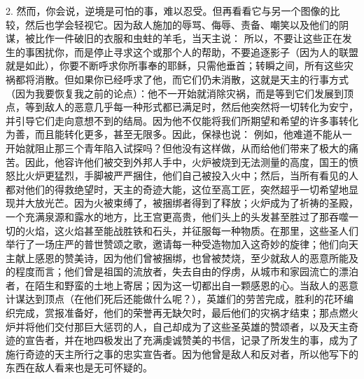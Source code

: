 2. 然而，你会说，逆境是可怕的事，难以忍受。但再看看它与另一个图像的比较，然后也学会轻视它。因为敌人施加的辱骂、侮辱、责备、嘲笑以及他们的阴谋，被比作一件破旧的衣服和虫蛀的羊毛，当天主说： 所以，不要让这些正在发生的事困扰你，而是停止寻求这个或那个人的帮助，不要追逐影子（因为人的联盟就是如此），你要不断呼求你所事奉的耶稣，只需他垂首；转瞬之间，所有这些灾祸都将消散。但如果你已经呼求了他，而它们仍未消散，这就是天主的行事方式（因为我要恢复我之前的论点）：他不一开始就消除灾祸，而是等到它们发展到顶点，等到敌人的恶意几乎每一种形式都已满足时，然后他突然将一切转化为安宁，并引导它们走向意想不到的结局。因为他不仅能将我们所期望和希望的许多事转化为善，而且能转化更多，甚至无限多。因此，保禄也说： 例如，他难道不能从一开始就阻止那三个青年陷入试探吗？但他没有这样做，从而给他们带来了极大的痛苦。因此，他容许他们被交到外邦人手中，火炉被烧到无法测量的高度，国王的愤怒比火炉更猛烈，手脚被严严捆住，他们自己被投入火中；然后，当所有看见的人都对他们的得救绝望时，天主的奇迹大能，这位至高工匠，突然超乎一切希望地显现并大放光芒。因为火被束缚了，被捆绑者得到了释放；火炉成为了祈祷的圣殿，一个充满泉源和露水的地方，比王宫更高贵，他们头上的头发甚至胜过了那吞噬一切的火焰，这火焰甚至能战胜铁和石头，并征服每一种物质。在那里，这些圣人们举行了一场庄严的普世赞颂之歌，邀请每一种受造物加入这奇妙的旋律；他们向天主献上感恩的赞美诗，因为他们曾被捆绑，也曾被焚烧，至少就敌人的恶意所能及的程度而言；他们曾是祖国的流放者，失去自由的俘虏，从城市和家园流亡的漂泊者，在陌生和野蛮的土地上寄居；因为这一切都出自一颗感恩的心。当敌人的恶意计谋达到顶点（在他们死后还能做什么呢？），英雄们的劳苦完成，胜利的花环编织完成，赏报准备好，他们的荣誉再无缺欠时，最后他们的灾祸才结束；那点燃火炉并将他们交付那巨大惩罚的人，自己却成为了这些圣英雄的赞颂者，以及天主奇迹的宣告者，并在地四极发出了充满虔诚赞美的书信，记录了所发生的事，成为了施行奇迹的天主所行之事的忠实宣告者。因为他曾是敌人和反对者，所以他写下的东西在敌人看来也是无可怀疑的。\par

